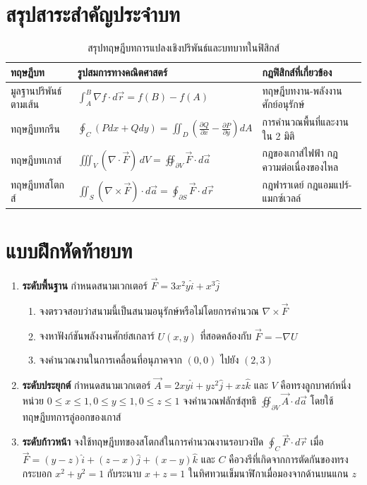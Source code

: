 \section{สรุปสาระสำคัญประจำบท}
\begin{table}[H]
\centering
\caption{สรุปทฤษฎีบทการแปลงเชิงปริพันธ์และบทบาทในฟิสิกส์}
\label{tab:ch07_summary}
\begin{tabularx}{\textwidth}{p{3.2cm}p{5.8cm}Y}
\toprule
\textbf{ทฤษฎีบท} & \textbf{รูปสมการทางคณิตศาสตร์} & \textbf{กฎฟิสิกส์ที่เกี่ยวข้อง} \\
\midrule
มูลฐานปริพันธ์ตามเส้น & $\int_A^B \nabla f \cdot d\vec{r} = f(B) - f(A)$ & ทฤษฎีบทงาน-พลังงาน ศักย์อนุรักษ์ \\
ทฤษฎีบทกรีน & $\oint_C (Pdx + Qdy) = \iint_D \left(\frac{\partial Q}{\partial x} - \frac{\partial P}{\partial y}\right)dA$ & การคำนวณพื้นที่และงานใน 2 มิติ \\
ทฤษฎีบทเกาส์ & $\iiint_V (\nabla \cdot \vec{F}) \, dV = \oiint_{\partial V} \vec{F} \cdot d\vec{a}$ & กฎของเกาส์ไฟฟ้า กฎความต่อเนื่องของไหล \\
ทฤษฎีบทสโตกส์ & $\iint_S (\nabla \times \vec{F}) \cdot d\vec{a} = \oint_{\partial S} \vec{F} \cdot d\vec{r}$ & กฎฟาราเดย์ กฎแอมแปร์-แมกซ์เวลล์ \\
\bottomrule
\end{tabularx}
\end{table}

\section{แบบฝึกหัดท้ายบท}
\begin{enumerate}
    \item \textbf{ระดับพื้นฐาน} กำหนดสนามเวกเตอร์ $\vec{F} = 3x^2 y \hat{i} + x^3 \hat{j}$
    \begin{enumerate}
        \item จงตรวจสอบว่าสนามนี้เป็นสนามอนุรักษ์หรือไม่โดยการคำนวณ $\nabla \times \vec{F}$
        \item จงหาฟังก์ชันพลังงานศักย์สเกลาร์ $U(x, y)$ ที่สอดคล้องกับ $\vec{F} = -\nabla U$
        \item จงคำนวณงานในการเคลื่อนที่อนุภาคจาก $(0,0)$ ไปยัง $(2,3)$
    \end{enumerate}

    \item \textbf{ระดับประยุกต์} กำหนดสนามเวกเตอร์ $\vec{A} = 2xy\hat{i} + yz^2\hat{j} + xz\hat{k}$ และ $V$ คือทรงลูกบาศก์หนึ่งหน่วย $0 \le x \le 1, 0 \le y \le 1, 0 \le z \le 1$ จงคำนวณฟลักซ์สุทธิ $\oiint_{\partial V} \vec{A} \cdot d\vec{a}$ โดยใช้ทฤษฎีบทการลู่ออกของเกาส์

    \item \textbf{ระดับก้าวหน้า} จงใช้ทฤษฎีบทของสโตกส์ในการคำนวณงานรอบวงปิด $\oint_C \vec{F} \cdot d\vec{r}$ เมื่อ $\vec{F} = (y - z)\hat{i} + (z - x)\hat{j} + (x - y)\hat{k}$ และ $C$ คือวงรีที่เกิดจากการตัดกันของทรงกระบอก $x^2 + y^2 = 1$ กับระนาบ $x + z = 1$ ในทิศทวนเข็มนาฬิกาเมื่อมองจากด้านบนแกน $z$
\end{enumerate}
